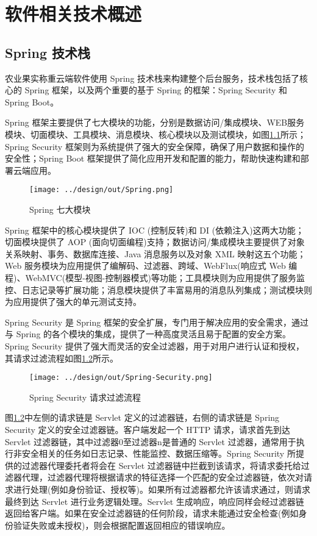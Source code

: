 \chapter{软件相关技术概述}

\section{Spring 技术栈}\label{sec:spring}

农业果实称重云端软件使用 Spring 技术栈来构建整个后台服务，技术栈包括了核心的 Spring 框架，以及两个重要的基于 Spring 的框架：Spring Security 和 Spring Boot。

Spring 框架主要提供了七大模块的功能，分别是数据访问/集成模块、WEB服务模块、切面模块、工具模块、消息模块、核心模块以及测试模块，如图\ref{fig:Spring}所示；Spring Security 框架则为系统提供了强大的安全保障，确保了用户数据和操作的安全性；Spring Boot 框架提供了简化应用开发和配置的能力，帮助快速构建和部署云端应用。

\begin{figure}[H]
    \centering
    \texttt{[image: ../design/out/Spring.png]}
    \caption{Spring 七大模块}
    \label{fig:Spring}
\end{figure}

Spring 框架中的核心模块提供了 IOC (控制反转)和 DI (依赖注入)这两大功能；切面模块提供了 AOP (面向切面编程)支持；数据访问/集成模块主要提供了对象关系映射、事务、数据库连接、Java 消息服务以及对象 XML 映射这五个功能；Web 服务模块为应用提供了编解码、过滤器、跨域、WebFlux(响应式 Web 编程)、WebMVC(模型-视图-控制器模式)等功能；工具模块则为应用提供了服务监控、日志记录等扩展功能；消息模块提供了丰富易用的消息队列集成；测试模块则为应用提供了强大的单元测试支持\cite{Spring-框架概述}。

Spring Security 是 Spring 框架的安全扩展，专门用于解决应用的安全需求，通过与 Spring 的各个模块的集成，提供了一种高度灵活且易于配置的安全方案。Spring Security 提供了强大而灵活的安全过滤器，用于对用户进行认证和授权，其请求过滤流程如图\ref{fig:Spring-Security}所示。

\begin{figure}[H]
    \centering
    \texttt{[image: ../design/out/Spring-Security.png]}
    \caption{Spring Security 请求过滤流程}
    \label{fig:Spring-Security}
\end{figure}

图\ref{fig:Spring-Security}中左侧的请求链是 Servlet 定义的过滤器链，右侧的请求链是 Spring Security 定义的安全过滤器链。客户端发起一个 HTTP 请求，请求首先到达 Servlet 过滤器链，其中过滤器0至过滤器n是普通的 Servlet 过滤器，通常用于执行非安全相关的任务如日志记录、性能监控、数据压缩等。Spring Security 所提供的过滤器代理委托者将会在 Servlet 过滤器链中拦截到该请求，将请求委托给过滤器代理，过滤器代理将根据请求的特征选择一个匹配的安全过滤器链，依次对请求进行处理(例如身份验证、授权等)。如果所有过滤器都允许该请求通过，则请求最终到达 Servlet 进行业务逻辑处理。Servlet 生成响应，响应同样会经过滤器链返回给客户端。如果在安全过滤器链的任何阶段，请求未能通过安全检查(例如身份验证失败或未授权)，则会根据配置返回相应的错误响应\cite{Spring-Security-架构设计}。

